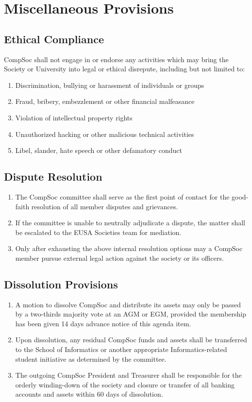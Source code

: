 \section{Miscellaneous Provisions}  
\subsection{Ethical Compliance}
CompSoc shall not engage in or endorse any activities which may bring the Society or University into legal or ethical disrepute, including but not limited to:  
\begin{enumerate}
    \item Discrimination, bullying or harassment of individuals or groups
    \item Fraud, bribery, embezzlement or other financial malfeasance  
    \item Violation of intellectual property rights
    \item Unauthorized hacking or other malicious technical activities
    \item Libel, slander, hate speech or other defamatory conduct
\end{enumerate}

\subsection{Dispute Resolution}  
\begin{enumerate}
    \item The CompSoc committee shall serve as the first point of contact for the good-faith resolution of all member disputes and grievances. 
    \item If the committee is unable to neutrally adjudicate a dispute, the matter shall be escalated to the EUSA Societies team for mediation.
    \item Only after exhausting the above internal resolution options may a CompSoc member pursue external legal action against the society or its officers.
\end{enumerate}

\subsection{Dissolution Provisions}
\begin{enumerate} 
    \item A motion to dissolve CompSoc and distribute its assets may only be passed by a two-thirds majority vote at an AGM or EGM, provided the membership has been given 14 days advance notice of this agenda item.
    \item Upon dissolution, any residual CompSoc funds and assets shall be transferred to the School of Informatics or another appropriate Informatics-related student initiative as determined by the committee.  
    \item The outgoing CompSoc President and Treasurer shall be responsible for the orderly winding-down of the society and closure or transfer of all banking accounts and assets within 60 days of dissolution.
\end{enumerate}

